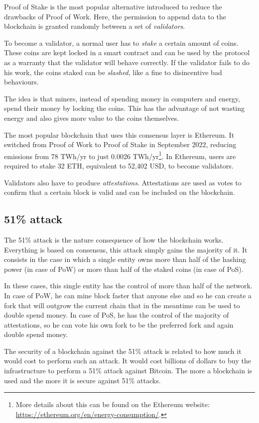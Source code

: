 Proof of Stake is the most popular alternative introduced to reduce the drawbacks of Proof of Work. Here, the permission to append data to the blockchain is granted randomly between a set of \textit{validators}. 

To become a validator, a normal user has to \textit{stake} a certain amount of coins. These coins are kept locked in a smart contract and can be used by the protocol as a warranty that the validator will behave correctly. If the validator fails to do his work, the coins staked can be \textit{slashed}, like a fine to disincentive bad behaviours.

The idea is that miners, instead of spending money in computers and energy, spend their money by locking the coins. This has the advantage of not wasting energy and also gives more value to the coins themselves.

The most popular blockchain that uses this consensus layer is Ethereum. It switched from Proof of Work to Proof of Stake in September 2022, reducing emissions from 78 TWh/yr to just 0.0026 TWh/yr\footnote{More details about this can be found on the Ethereum website: \url{https://ethereum.org/en/energy-consumption/}.}. In Ethereum, users are required to stake 32 ETH, equivalent to 52,402 USD, to become validators.

Validators also have to produce \textit{attestations}. Attestations are used as votes to confirm that a certain block is valid and can be included on the blockchain.

\subsection{51\% attack}

The 51\% attack is the nature consequence of how the blockchain works. Everything is based on consensus, this attack simply gains the majority of it. It consists in the case in which a single entity owns more than half of the hashing power (in case of PoW) or more than half of the staked coins (in case of PoS). 

In these cases, this single entity has the control of more than half of the network. In case of PoW, he can mine block faster that anyone else and so he can create a fork that will outgrow the current chain that in the meantime can be used to double spend money. In case of PoS, he has the control of the majority of attestations, so he can vote his own fork to be the preferred fork and again double spend money.

The security of a blockchain against the 51\% attack is related to how much it would cost to perform such an attack. It would cost billions of dollars to buy the infrastructure to perform a 51\% attack against Bitcoin. The more a blockchain is used and the more it is secure against 51\% attacks.

